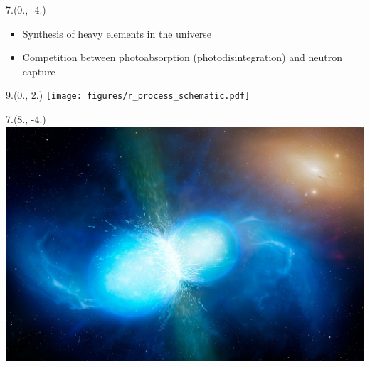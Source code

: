 



\begin{textblock}{7.}(0., -4.)
    \begin{itemize}
        \item Synthesis of heavy elements in the universe
        \item Competition between photoabsorption (photodisintegration) and neutron capture
    \end{itemize}
\end{textblock}

\begin{textblock}{9.}(0., 2.)
    \texttt{[image: figures/r\_process\_schematic.pdf]}
\end{textblock}

\begin{textblock}{7.}(8., -4.)
    \includegraphics[width=\textwidth]{figures/neutron_star_merger.jpg}
\end{textblock}